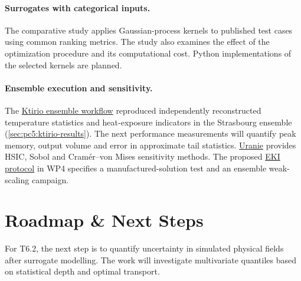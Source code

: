 \paragraph{Surrogates with categorical inputs.}
The comparative study applies Gaussian-process kernels to published
test cases using common ranking metrics. The study also examines the
effect of the optimization procedure and its computational cost.
Python implementations of the selected kernels are planned.

\paragraph{Ensemble execution and sensitivity.}
The \hyperref[sec:wp6:ensemble-streaming]{Ktirio ensemble workflow}
reproduced independently reconstructed temperature statistics and
heat-exposure indicators in the Strasbourg ensemble
(\cref{sec:pc5:ktirio-results}). The next performance measurements will
quantify peak memory, output volume and error in approximate tail statistics.
\hyperref[sec:Uranie:software]{Uranie} provides HSIC, Sobol and
Cram\'er--von Mises sensitivity methods. The proposed
\hyperref[sec:app:specs:app-eki]{EKI protocol} in WP4 specifies a
manufactured-solution test and an ensemble weak-scaling campaign.

\section{Roadmap \& Next Steps}

For T6.2, the next step is to quantify uncertainty in simulated physical
fields after surrogate modelling. The work will investigate multivariate
quantiles based on statistical depth and optimal transport.
